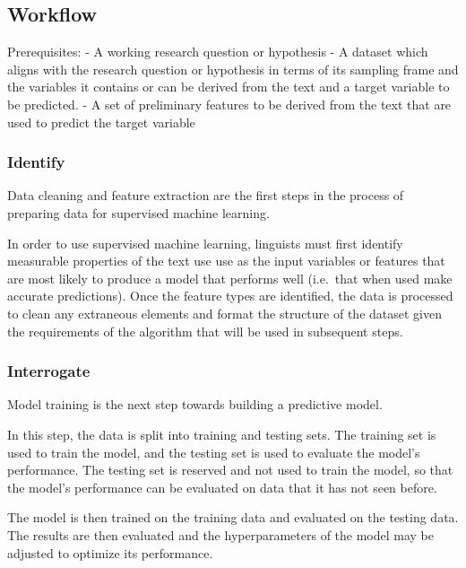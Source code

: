 \documentclass[
  letterpaper,
]{scrbook}
\begin{document}
\hypertarget{pda-workflow}{%
\subsection{Workflow}\label{pda-workflow}}

Prerequisites: - A working research question or hypothesis - A dataset
which aligns with the research question or hypothesis in terms of its
sampling frame and the variables it contains or can be derived from the
text and a target variable to be predicted. - A set of preliminary
features to be derived from the text that are used to predict the target
variable

\hypertarget{pda-identify}{%
\subsubsection{Identify}\label{pda-identify}}

Data cleaning and feature extraction are the first steps in the process
of preparing data for supervised machine learning.

In order to use supervised machine learning, linguists must first
identify measurable properties of the text use use as the input
variables or features that are most likely to produce a model that
performs well (i.e.~that when used make accurate predictions). Once the
feature types are identified, the data is processed to clean any
extraneous elements and format the structure of the dataset given the
requirements of the algorithm that will be used in subsequent steps.

\hypertarget{pda-interrogate}{%
\subsubsection{Interrogate}\label{pda-interrogate}}

Model training is the next step towards building a predictive model.

In this step, the data is split into training and testing sets. The
training set is used to train the model, and the testing set is used to
evaluate the model's performance. The testing set is reserved and not
used to train the model, so that the model's performance can be
evaluated on data that it has not seen before.

The model is then trained on the training data and evaluated on the
testing data. The results are then evaluated and the hyperparameters of
the model may be adjusted to optimize its performance.
\end{document}
